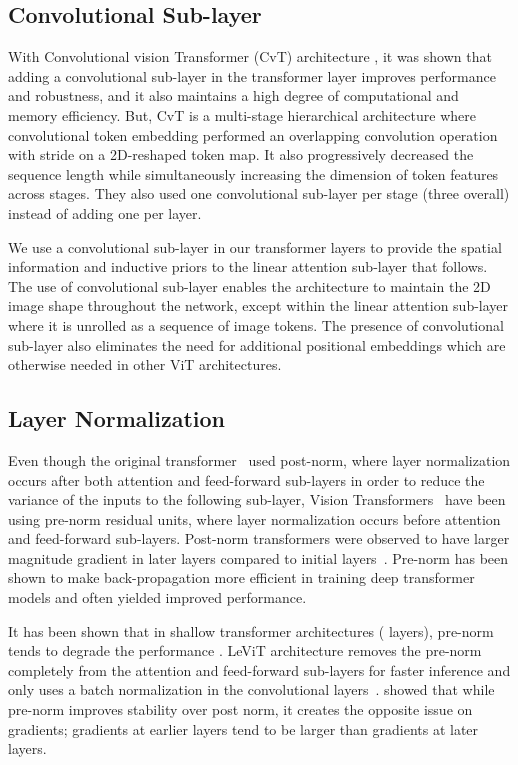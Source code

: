 \documentclass{article}
\begin{document}
\subsection{Convolutional Sub-layer}
With Convolutional vision Transformer (CvT) architecture \cite{wu2021cvt}, it was shown that adding a convolutional sub-layer in the transformer layer improves performance and robustness, and it also maintains a high degree of computational and memory efficiency. But, CvT is a multi-stage hierarchical architecture where convolutional token embedding performed an overlapping convolution operation with stride on a 2D-reshaped
token map. It also progressively decreased the sequence length while simultaneously increasing the dimension of token features across stages. They also used one convolutional sub-layer per stage (three overall) instead of adding one per layer.

We use a convolutional sub-layer in our transformer layers to provide the spatial information and inductive priors to the linear attention sub-layer that follows. The use of convolutional sub-layer enables the architecture to maintain the 2D image shape throughout the network, except within the linear attention sub-layer where it is unrolled as a sequence of image tokens. The presence of convolutional sub-layer also eliminates the need for additional positional embeddings which are otherwise needed in other ViT architectures.


\subsection{Layer Normalization}

Even though the original transformer~\cite{vaswani2017attention} used post-norm, where layer normalization occurs after both attention and feed-forward sub-layers in order to reduce the variance of the inputs to the following sub-layer, Vision Transformers~\cite{dosovitskiy2021image} have been using pre-norm residual units, where layer normalization occurs before attention and feed-forward sub-layers. Post-norm transformers were observed to have larger magnitude gradient in later layers compared to initial layers~\cite{xiong2020layer}. Pre-norm has been shown to make back-propagation more efficient in training deep transformer models and often yielded improved performance.

It has been shown that in shallow transformer architectures ( layers), pre-norm tends to degrade the performance \cite{Nguyen2019TransformersWT}. LeViT architecture removes the pre-norm completely from the attention and feed-forward sub-layers for faster inference and only uses a batch normalization in the convolutional layers~\cite{graham2021levit}. \cite{shleifer2021normformer} showed that while pre-norm improves stability over post norm, it creates the opposite issue on gradients; gradients at earlier layers tend to be larger than gradients at later layers.
\end{document}
